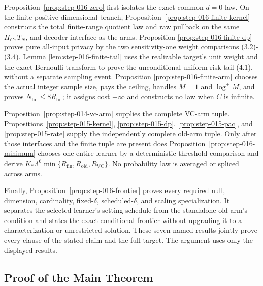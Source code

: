 Proposition~\ref{prop:step-016-zero} first isolates the exact common
\(d=0\) law. On the finite positive-dimensional branch,
Proposition~\ref{prop:step-016-finite-kernel} constructs the total
finite-range quotient law and raw pullback on the same \(H_C,T_N\), and
decoder interface as the  arms. Proposition
\ref{prop:step-016-finite-dp} proves pure all-input privacy by the two
sensitivity-one weight comparisons (3.2)-(3.4). Lemma
\ref{lem:step-016-finite-tail} uses the realizable target's unit weight and
the exact Bernoulli transform to prove the unconditional uniform risk tail
(4.1), without a separate sampling event. Proposition
\ref{prop:step-016-finite-arm} chooses the actual integer sample size, pays
the ceiling, handles \(M=1\) and \(\log^+M\), and proves
\(N_{\mathrm{fin}}\le8R_{\mathrm{fin}}\); it assigns cost \(+\infty\) and
constructs no law when \(C\) is infinite.

Proposition~\ref{prop:step-014-vc-arm} supplies the complete
VC-arm tuple.  Propositions~\ref{prop:step-015-kernel},
\ref{prop:step-015-dp}, \ref{prop:step-015-pac}, and
\ref{prop:step-015-rate} supply the independently complete old-arm tuple.
Only after those interfaces and the finite tuple are present does
Proposition~\ref{prop:step-016-minimum} chooses one entire learner by a
deterministic threshold comparison and derive
\(K_*\Lambda^6\min\{R_{\mathrm{fin}},R_{\mathrm{old}},R_{\mathrm{VC}}\}\).
No probability law is averaged or spliced across arms.

Finally, Proposition~\ref{prop:step-016-frontier} proves every required null,
dimension, cardinality, fixed-\(\delta\), scheduled-\(\delta\), and scaling
specialization. It separates the selected learner's setting schedule from
the standalone old arm's condition and states the exact conditional frontier
without upgrading it to a characterization or unrestricted solution. These
seven named results jointly prove every clause of the stated claim and
the full target. The argument uses only the displayed results.



\subsection{Proof of the Main Theorem}\label{app:main-proof}

